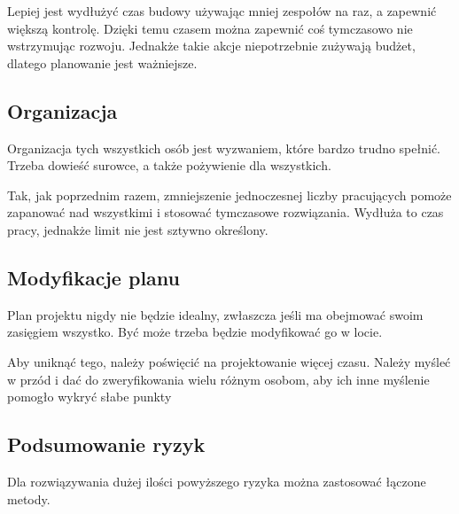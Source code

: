Lepiej jest wydłużyć czas budowy używając mniej zespołów na raz, a zapewnić większą kontrolę. Dzięki temu czasem można zapewnić coś tymczasowo nie wstrzymując rozwoju.
Jednakże takie akcje niepotrzebnie zużywają budżet, dlatego planowanie jest ważniejsze.

\subsection{Organizacja}
Organizacja tych wszystkich osób jest wyzwaniem, które bardzo trudno spełnić. Trzeba dowieść surowce, a także pożywienie dla wszystkich. 

Tak, jak poprzednim razem, zmniejszenie jednoczesnej liczby pracujących pomoże zapanować nad wszystkimi i stosować tymczasowe rozwiązania.
Wydłuża to czas pracy, jednakże limit nie jest sztywno określony.
 
\subsection{Modyfikacje planu}
Plan projektu nigdy nie będzie idealny, zwłaszcza jeśli ma obejmować swoim zasięgiem wszystko. Być może trzeba będzie modyfikować go w locie. 

Aby uniknąć tego, należy poświęcić na projektowanie więcej czasu. Należy myśleć w przód i dać do zweryfikowania wielu różnym osobom, aby ich inne myślenie pomogło wykryć słabe punkty

\subsection{Podsumowanie ryzyk}
Dla rozwiązywania dużej ilości powyższego ryzyka można zastosować łączone metody.


